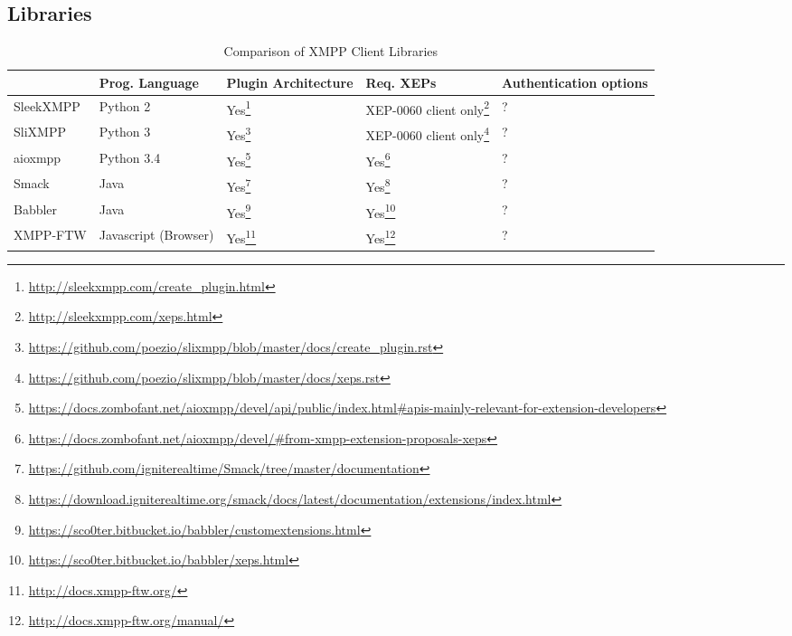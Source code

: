 \subsection{Libraries}

\begin{sidewaystable}
    \centering
    \caption{Comparison of XMPP Client Libraries}
    \label{tbl:language-comparison-ds}
    \begin{tabu}{X|X X X X}
        \hline
        & Prog. Language
        & Plugin Architecture
        & Req. XEPs
        & Authentication options
        \\ \hline

        SleekXMPP
        & Python 2
        & Yes\footnote{\url{http://sleekxmpp.com/create_plugin.html}}
        & XEP-0060 client only\footnote{\url{http://sleekxmpp.com/xeps.html}}
        & ?
        \\

        SliXMPP
        & Python 3
        & Yes\footnote{\url{https://github.com/poezio/slixmpp/blob/master/docs/create_plugin.rst}}
        & XEP-0060 client only\footnote{\url{https://github.com/poezio/slixmpp/blob/master/docs/xeps.rst}}
        & ?
        \\

        aioxmpp
        & Python 3.4
        & Yes\footnote{\url{https://docs.zombofant.net/aioxmpp/devel/api/public/index.html\#apis-mainly-relevant-for-extension-developers}}
        & Yes\footnote{\url{https://docs.zombofant.net/aioxmpp/devel/\#from-xmpp-extension-proposals-xeps}}
        & ?
        \\

        Smack
        & Java
        & Yes\footnote{\url{https://github.com/igniterealtime/Smack/tree/master/documentation}}
        & Yes\footnote{\url{https://download.igniterealtime.org/smack/docs/latest/documentation/extensions/index.html}}
        & ?
        \\

        Babbler
        & Java
        & Yes\footnote{\url{https://sco0ter.bitbucket.io/babbler/customextensions.html}}
        & Yes\footnote{\url{https://sco0ter.bitbucket.io/babbler/xeps.html}}
        & ?
        \\

        XMPP-FTW
        & Javascript (Browser)
        & Yes\footnote{\url{http://docs.xmpp-ftw.org/}}
        & Yes\footnote{\url{http://docs.xmpp-ftw.org/manual/}}
        & ?
        \\
    \end{tabu}
\end{sidewaystable}
